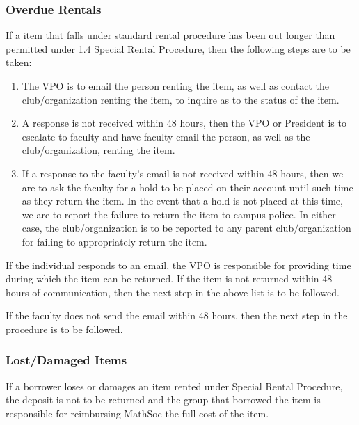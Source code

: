 \subsubsection{Overdue Rentals}
If a item that falls under standard rental procedure has been out longer than permitted under 1.4 Special Rental Procedure, then the following steps are to be taken:
\begin{enumerate}
    \item The VPO is to email the person renting the item, as well as contact the club/organization renting the item, to inquire as to the status of the item.
    \item A response is not received within 48 hours, then the VPO or President is to escalate to faculty and have faculty email the person, as well as the club/organization, renting the item.
    \item If a response to the faculty's email is not received within 48 hours, then we are to ask the faculty for a hold to be placed on their account until such time as they return the item. In the event that a hold is not placed at this time, we are to report the failure to return the item to campus police. In either case, the club/organization is to be reported to any parent club/organization for failing to appropriately return the item.
\end{enumerate}

If the individual responds to an email, the VPO is responsible for providing time during which the item can be returned. If the item is not returned within 48 hours of communication, then the next step in the above list is to be followed.

If the faculty does not send the email within 48 hours, then the next step in the procedure is to be followed.

\subsubsection{Lost/Damaged Items}
If a borrower loses or damages an item rented under Special Rental Procedure, the deposit is not to be returned and the group that borrowed the item is responsible for reimbursing MathSoc the full cost of the item.
